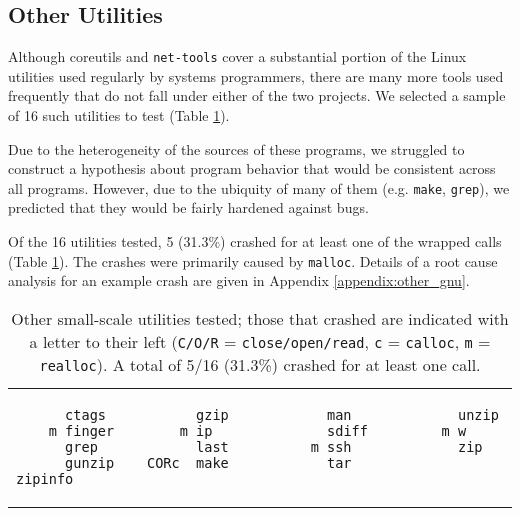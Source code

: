 \subsection{Other Utilities}
Although coreutils and \texttt{net-tools} cover a substantial portion of the Linux utilities used regularly by systems programmers, there are many more tools used frequently that do not fall under either of the two projects. We selected a sample of 16 such utilities to test (Table \ref{lst:other_utilities}).

Due to the heterogeneity of the sources of these programs, we struggled to construct a hypothesis about program behavior that would be consistent across all programs. However, due to the ubiquity of many of them (e.g. \texttt{make}, \texttt{grep}), we predicted that they would be fairly hardened against bugs.

Of the 16 utilities tested, 5 (31.3\%) crashed for at least one of the wrapped calls (Table \ref{lst:other_utilities}). The crashes were primarily caused by \texttt{malloc}. Details of a root cause analysis for an example crash are given in Appendix \ref{appendix:other_gnu}.

\begin{table}[h]
\begin{tabular}{l}
\begin{lstlisting}
      ctags           gzip            man             unzip
    m finger        m ip              sdiff         m w
      grep            last          m ssh             zip
      gunzip    CORc  make            tar             zipinfo
\end{lstlisting}
\end{tabular}
\caption{Other small-scale utilities tested; those that crashed are indicated with a letter to their left (\texttt{C/O/R} = \texttt{close/open/read}, \texttt{c} = \texttt{calloc}, \texttt{m} = \texttt{realloc}). A total of 5/16 (31.3\%) crashed for at least one call.}
\label{lst:other_utilities}
\end{table}